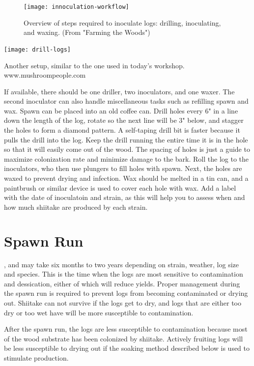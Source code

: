 \documentclass{tufte-handout}
\begin{document}
\begin{figure}
\texttt{[image: innoculation-workflow]}
\caption{Overview of steps required to inoculate logs: drilling, inoculating, and waxing. (From "Farming the Woods")}
\end{figure}

\begin{marginfigure}
\texttt{[image: drill-logs]}
\caption{Another setup, similar to the one  used in today's workshop. www.mushroompeople.com}
\end{marginfigure}

If available, there should be one driller, two inoculators, and one waxer.
The second inoculator can also handle miscellaneous tasks such as refilling spawn and wax.
Spawn can be placed into an old coffee can. 
Drill holes every 6" in a line down the length of the log, rotate so the next line will be 3" below, and stagger the holes to form a diamond pattern. 
A self-taping drill bit is faster because it pulls the drill into the log.
Keep the drill running the entire time it is in the hole so that it will easily come out of the wood. 
The spacing of holes is just a guide to maximize colonization rate
and minimize damage to the bark. 
Roll the log to the inoculators, who then use plungers to fill holes with spawn.
Next, the holes are waxed to prevent
drying and infection. 
Wax should be melted in a tin can, and a paintbrush or similar device is used to cover each hole with wax.
Add a label with the date of inoculatoin and strain, as this will help you to assess
when and how much shiitake are produced
by each strain.

\section{Spawn Run}

, and may take six months to two years depending on strain, weather, log size and species.
This is the time when the logs are most sensitive to contamination and dessication,  either of which will reduce yields.
Proper management during the spawn run is required to prevent logs from becoming contaminated or drying out.
Shiitake can not survive if the logs get to dry, and logs that are either too dry or too wet have will be more susceptible to contamination.

After the spawn run, the logs are less susceptible to contamination because most of the wood substrate has been colonized by shiitake. 
Actively fruiting logs will be less susceptible to drying out if the soaking method described below is used to stimulate production. 
\end{document}
